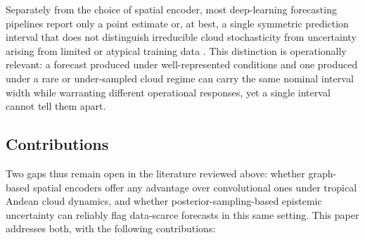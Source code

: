 Separately from the choice of spatial encoder, most deep-learning forecasting
pipelines report only a point estimate or, at best, a single symmetric
prediction interval that does not distinguish irreducible cloud stochasticity
from uncertainty arising from limited or atypical training data
\cite{kendall2017}. This distinction is operationally relevant: a forecast
produced under well-represented conditions and one produced under a rare or
under-sampled cloud regime can carry the same nominal interval width while
warranting different operational responses, yet a single interval cannot
tell them apart.

\subsection*{Contributions}

Two gaps thus remain open in the literature reviewed above: whether
graph-based spatial encoders offer any advantage over convolutional ones
under tropical Andean cloud dynamics, and whether posterior-sampling-based
epistemic uncertainty can reliably flag data-scarce forecasts in this same
setting. This paper addresses both, with the following contributions:

